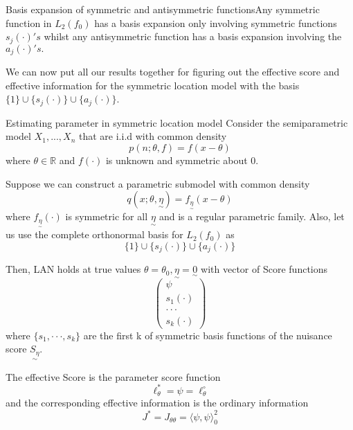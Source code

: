 \documentclass[twoside]{article}
\newcommand{\real}{\mathbb{R}}
\newcommand{\utilde}{\underset{\sim}}
\begin{document}
\begin{proposition_exam}{Basis expansion of symmetric and antisymmetric functions}{}Any symmetric function in $L_2(f_0)$ has a basis expansion only involving symmetric functions $s_j(\cdot)'s$ whilst any antisymmetric function has a basis expansion involving the $a_j(\cdot)'s.$
\end{proposition_exam}

We can now put all our results together for figuring out the effective score and effective information for the symmetric location model with the basis $\{1\} \cup \{s_j(\cdot)\} \cup \{a_j(\cdot)\}$.

\begin{theorem_exam}{Estimating parameter in symmetric location model}{}
Consider the semiparametric model $X_1, ... , X_n$ that are i.i.d with common density 
$$
p(n;\theta,f) = f(x - \theta)
$$
where $\theta \in \real$ and $f(\cdot)$ is unknown and symmetric about 0.

Suppose we can construct a parametric submodel with common density 
$$
q(x; \theta, \utilde{\eta}) = f_{\utilde{\eta}}(x - \theta)
$$
where $f_{\utilde{\eta}}(\cdot)$ is symmetric for all $\utilde{\eta}$ and is a regular parametric family. Also, let us use the complete orthonormal basis for $L_2(f_{0})$ as 
$$
\{1\} \cup \{s_j(\cdot)\} \cup \{a_j(\cdot)\}
$$ 

Then, LAN holds at true values $\theta = \theta_0, \utilde{\eta} = \utilde{0}$ with vector of Score functions 
$$
\begin{pmatrix}
\psi \\
s_1(\cdot)\\
\cdot \cdot \cdot \\
s_k(\cdot)
\end{pmatrix}
$$
where $\{s_1, \cdot \cdot \cdot , s_k\}$ are the first k of symmetric basis functions of the nuisance score $\utilde{S_{\eta}}.$

The effective Score is the parameter score function
$$
\ell_{\theta}^{*} = \psi = \ell_{\theta}^{\circ}
$$
and the corresponding effective information is the ordinary information 
$$
J^{*} = J_{\theta \theta} = \langle \psi, \psi \rangle_{0}^{2}
$$
\end{theorem_exam}
\end{document}
